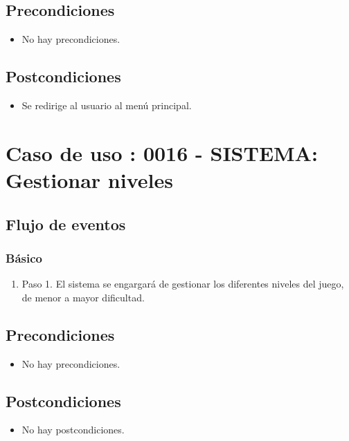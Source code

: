 \subsection{Precondiciones}
\begin{itemize}
\item No hay precondiciones.
\end{itemize}

\subsection{Postcondiciones}
\begin{itemize}
\item Se redirige al usuario al menú principal.
\end{itemize}



\section{Caso de uso : 0016 - SISTEMA: Gestionar niveles}\label{sec:uc0}
\subsection{Flujo de eventos}
\subsubsection{Básico}

\begin{enumerate}
\item Paso 1.
El sistema se engargará de gestionar los diferentes niveles del juego, de menor a mayor dificultad.
\end{enumerate}

\subsection{Precondiciones}
\begin{itemize}
\item No hay precondiciones.
\end{itemize}

\subsection{Postcondiciones}
\begin{itemize}
\item No hay postcondiciones.
\end{itemize}



